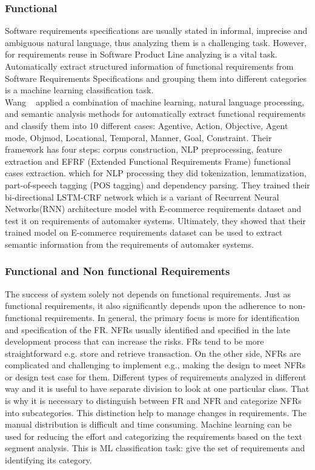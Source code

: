 \subsubsection{Functional}

Software requirements specifications are usually stated in informal, imprecise
and ambiguous natural language, thus analyzing them is a challenging task.
However, for requirements reuse in Software Product Line analyzing is a vital
task. Automatically extract structured information of functional requirements
from Software Requirements Specifications and grouping them into different
categories is a machine learning classification task\cite{7949577}. \\

Wang \etal~\cite{7949577} applied a combination of machine learning, natural
language processing, and semantic analysis methods for automatically extract functional requirements and classify
them into 10 different cases: Agentive, Action, Objective, Agent mode, Objmod, Locational, Temporal, Manner, Goal,
Constraint. Their framework has four steps: corpus construction,  NLP 
preprocessing, feature extraction and  EFRF (Extended Functional Requirements
Frame) functional cases extraction. which for NLP processing they did
tokenization,   lemmatization, part-of-speech tagging (POS  tagging) and
dependency parsing. They trained their bi-directional LSTM-CRF network which is
a variant of Recurrent Neural Networks(RNN) architecture model with E-commerce
requirements dataset and test it on requirements of automaker systems.
Ultimately, they showed that their trained model on E-commerce requirements
dataset can be used to extract semantic information from the requirements of
automaker systems.

\subsubsection{Functional and Non functional Requirements}

The success of system solely not depends on functional requirements. Just as
functional requirements, it also significantly depends upon the adherence to
non-functional requirements. In general, the primary focus is more for
identification and specification of the FR.  NFRs usually identified and
specified in the late development process that can increase the risks. FRs tend
to be more straightforward e.g. store and retrieve transaction. On the other
side, NFRs are complicated and challenging to implement e.g., making the design
to meet NFRs or design test case for them. Different types of requirements
analyzed in different way and it is useful to have separate division to look at
one particular class. That is why it is necessary to distinguish between FR and
NFR and categorize NFRs into subcategories. This distinction help to manage
changes in requirements. The manual distribution is difficult and time
consuming. Machine learning can be used for reducing the effort and categorizing
the requirements based on the text segment analysis. This is ML classification
task: give the set of requirements and identifying its category. \\


